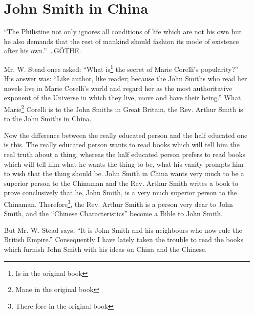 \chapter{John Smith in China}
{ \scriptsize ``The Philistine not only ignores all conditions of life which are not his own but he also demands that the rest of mankind should fashion its mode of existence after his own.''\cite{num24} \dots G\"OTHE.}

Mr. W. Stead once asked: ``What is\footnote{Is in the original book} the secret of Marie Corelli's popularity?'' His answer was: ``Like author, like reader; because the John Smiths who read her novels live in Marie Corelli's world and regard her as the most authoritative exponent of the Universe in which they live, move and have their being.''
What Marie\footnote{Mane in the original book} Corelli is to the John Smiths in Great Britain, the Rev. Arthur Smith is to the John Smiths in China.

Now the difference between the really educated person and the half educated one is this.
The really educated person wants to read books which will tell him the real truth about a thing, whereas the half educated person prefers to read books which will tell him what he wants the thing to be, what his vanity prompts him to wish that the thing should be.
John Smith in China wants very much to be a superior person to the Chinaman and the Rev. Arthur Smith writes a book to prove conclusively that he, John Smith, is a very much superior person to the Chinaman.
Therefore\footnote{There-fore in the original book}, the Rev. Arthur Smith is a person very dear to John Smith, and the ``Chinese Characteristics'' become a Bible to John Smith.

But Mr. W. Stead says, ``It is John Smith and his neighbours who now rule the British Empire.''
Consequently I have lately taken the trouble to read the books which furnish John Smith with his ideas on China and the Chinese.


